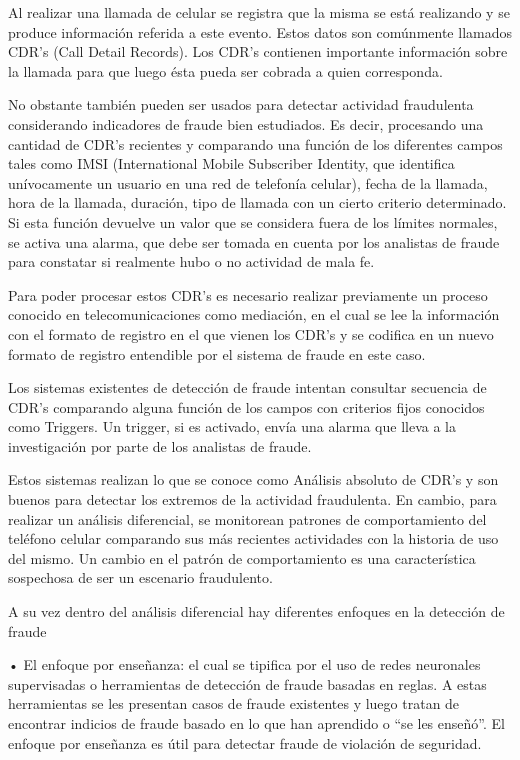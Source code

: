 \documentclass[a4paper,11pt]{article}
\begin{document}
      Al realizar una llamada de celular se registra que la  misma  se  está
realizando y se produce información referida a este evento. Estos datos  son
comúnmente  llamados  CDR’s  (Call  Detail  Records).  Los  CDR’s  contienen
importante información sobre la  llamada  para  que  luego  ésta  pueda  ser
cobrada a quien corresponda.

       No  obstante  también  pueden  ser  usados  para  detectar  actividad
fraudulenta considerando indicadores de fraude bien  estudiados.  Es  decir,
procesando una cantidad de CDR’s recientes y comparando una función  de  los
diferentes  campos  tales  como  IMSI   (International   Mobile   Subscriber
Identity, que identifica unívocamente un usuario en  una  red  de  telefonía
celular), fecha de la  llamada,  hora  de  la  llamada,  duración,  tipo  de
llamada con un cierto criterio determinado.  Si  esta  función  devuelve  un
valor que se considera fuera de los límites normales, se activa una  alarma,
que debe ser tomada en cuenta por los analistas de fraude para constatar  si
realmente hubo o no actividad de mala fe.

      Para poder procesar estos CDR’s es necesario realizar  previamente  un
proceso conocido en telecomunicaciones como mediación, en el cual se lee  la
información con el formato de registro en el que  vienen  los  CDR’s   y  se
codifica en un nuevo formato  de  registro  entendible  por  el  sistema  de
fraude en este caso.

      Los sistemas existentes de  detección  de  fraude  intentan  consultar
secuencia de CDR’s comparando alguna función de  los  campos  con  criterios
fijos conocidos como Triggers. Un trigger, si es activado, envía una  alarma
que lleva a la investigación por parte de los analistas de fraude.



      Estos sistemas realizan  lo que se conoce como  Análisis  absoluto  de
CDR’s y son buenos para detectar los extremos de la  actividad  fraudulenta.
En cambio, para realizar un análisis diferencial, se monitorean patrones  de
comportamiento  del  teléfono   celular   comparando   sus   más   recientes
actividades con la historia de uso del mismo. Un  cambio  en  el  patrón  de
comportamiento  es  una  característica  sospechosa  de  ser  un   escenario
fraudulento.


A su vez dentro del análisis diferencial hay diferentes enfoques en la
detección de fraude


      • El enfoque por enseñanza: el cual se tipifica por el  uso  de  redes
neuronales supervisadas o herramientas de detección  de  fraude  basadas  en
reglas. A estas herramientas se les presentan casos de fraude  existentes  y
luego tratan de encontrar indicios de fraude basado en lo que han  aprendido
o “se les enseñó”. El enfoque por enseñanza es útil para detectar fraude  de
violación de seguridad.
\end{document}
